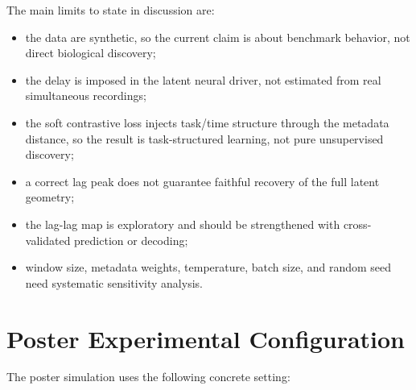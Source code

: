 \documentclass[11pt]{article}
\begin{document}
The main limits to state in discussion are:

\begin{itemize}
    \item the data are synthetic, so the current claim is about benchmark
    behavior, not direct biological discovery;
    \item the delay is imposed in the latent neural driver, not estimated from
    real simultaneous recordings;
    \item the soft contrastive loss injects task/time structure through the
    metadata distance, so the result is task-structured learning, not pure
    unsupervised discovery;
    \item a correct lag peak does not guarantee faithful recovery of the full
    latent geometry;
    \item the lag-lag map is exploratory and should be strengthened with
    cross-validated prediction or decoding;
    \item window size, metadata weights, temperature, batch size, and random
    seed need systematic sensitivity analysis.
\end{itemize}

\section{Poster Experimental Configuration}

The poster simulation uses the following concrete setting:
\end{document}
